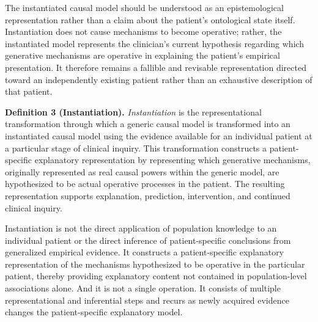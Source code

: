 \documentclass[11pt]{article}
\begin{document}
\medskip

The instantiated causal model should be understood as an epistemological representation rather than a claim about the patient's ontological state itself. Instantiation does not cause mechanisms to become operative; rather, the instantiated model represents the clinician's current hypothesis regarding which generative mechanisms are operative in explaining the patient's empirical presentation. It therefore remains a fallible and revisable representation directed toward an independently existing patient rather than an exhaustive description of that patient.

\medskip

\noindent\textbf{Definition 3 (Instantiation).}
\emph{Instantiation} is the representational transformation through which a generic causal model is transformed into an instantiated causal model using the evidence available for an individual patient at a particular stage of clinical inquiry. This transformation constructs a patient-specific explanatory representation by representing which generative mechanisms, originally represented as real causal powers within the generic model, are hypothesized to be actual operative processes in the patient. The resulting representation supports explanation, prediction, intervention, and continued clinical inquiry.

Instantiation is not the direct application of population knowledge to an individual patient or the direct inference of patient-specific conclusions from generalized empirical evidence. It constructs a patient-specific explanatory representation of the mechanisms hypothesized to be operative in the particular patient, thereby providing explanatory content not contained in population-level associations alone. And it is not a single operation. It consists of multiple representational and inferential steps and recurs as newly acquired evidence changes the patient-specific explanatory model. 
\end{document}
